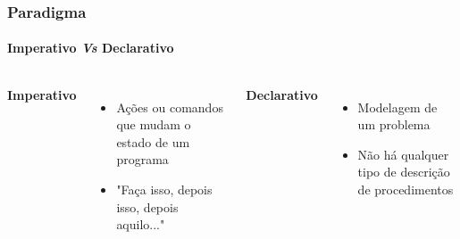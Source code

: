 \begin{frame}
    \frametitle{Paradigma}
    \framesubtitle{Imperativo \emph{Vs} Declarativo}

    \pause

    \begin{columns}
      \textbf{Imperativo} 

      \begin{itemize}
        \item Ações ou comandos que mudam o estado de um programa 
        \item "Faça isso, depois isso, depois aquilo..." \pause
      \end{itemize}


      \textbf{Declarativo} 
      \begin{itemize}
        \item Modelagem de um problema 
        \item Não há qualquer tipo de descrição de procedimentos
      \end{itemize}

    \end{columns}
\end{frame}